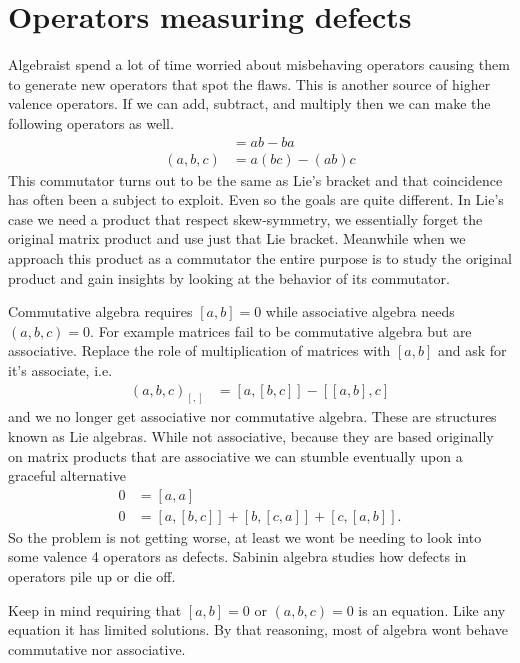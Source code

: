 \section{Operators measuring defects}
Algebraist spend a lot of time worried about misbehaving operators 
causing them to generate new operators that spot the flaws.  This is another 
source of higher valence operators. If 
we can add, subtract, and multiply then we can make the following operators as well.
\begin{align*}
    [a,b] & = ab-ba \tag{Commutator}\\
    (a,b,c) & = a(bc)-(ab)c \tag{Associator}
\end{align*}
This commutator turns out to be the same as Lie's bracket and that coincidence 
has often been a subject to exploit.  Even so the goals are quite different. 
In Lie's case we need a product that respect skew-symmetry, we essentially forget 
the original matrix product and use just that Lie bracket.  Meanwhile when we 
approach this product as a commutator the entire purpose is to study the original 
product and gain insights by looking at the behavior of its commutator.

Commutative algebra requires $[a,b]=0$ while associative algebra needs $(a,b,c)=0$.
For example matrices fail to be commutative algebra but are associative.
Replace the role of multiplication of matrices with $[a,b]$ and ask for it's 
associate, i.e.
\begin{align*}
    (a,b,c)_{[,]} & = [a,[b,c]]-[[a,b],c]
\end{align*}
and we no longer get associative nor commutative algebra.  These are structures 
known as Lie algebras.  While not associative, because they are based originally 
on matrix products that are associative we can stumble eventually upon a 
graceful alternative
\begin{align*}
    0 & = [a,a] \tag{Alternating}\\
    0 & = [a,[b,c]]+[b,[c,a]]+[c,[a,b]].    
    \tag{Jacobi}
\end{align*}
So the problem is not getting worse, at least we wont be needing 
to look into some  valence 4 operators as defects.  Sabinin algebra 
studies how defects in operators pile up or die off.



Keep in mind requiring that $[a,b]=0$ or $(a,b,c)=0$ is an equation. 
Like any equation it has limited solutions.  By that reasoning, 
most of algebra wont behave commutative nor associative.

